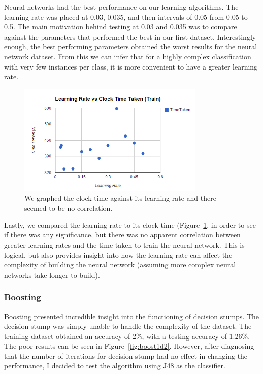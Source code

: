 \documentclass[annual]{acmsiggraph}
\begin{document}
Neural networks had the best performance on our learning algorithms. The learning
rate was placed at 0.03, 0.035, and then intervals of 0.05 from 0.05 to 0.5. The
main motivation behind testing at 0.03 and 0.035 was to compare against the parameters
that performed the best in our first dataset. Interestingly enough, the best
performing parameters obtained the worst results for the neural network dataset.
From this we can infer that for a highly complex classification with very few
instances per class, it is more convenient to have a greater learning rate.

\begin{figure}[ht]
  \centering
  \includegraphics[width=3.5in]{charts/chart_2_nn_d2.PNG}
  \caption{We graphed the clock time against its learning rate and there
  seemed to be no correlation.}
  \label{fig:nn2d2}
\end{figure}

Lastly, we compared the learning rate to its clock time (Figure~\ref{fig:nn2d2}, 
in order to see if there was any significance, but there was no apparent 
correlation between greater learning rates and the time taken to train the 
neural network. This is logical, but also provides insight into how the learning 
rate can affect the complexity of building the neural network (assuming more 
complex neural networks take longer to build).

\subsubsection{Boosting}

Boosting presented incredible insight into the functioning of decision stumps.
The decision stump was simply unable to handle the complexity of the dataset.
The training dataset obtained an accuracy of 2\%, with a testing accuracy of
1.26\%. The poor results can be seen in Figure~\ref{fig:boost1d2}. However, after
diagnosing that the number of iterations for decision stump had no effect in 
changing the performance, I decided to test the algorithm using J48 as the classifier.
\end{document}
